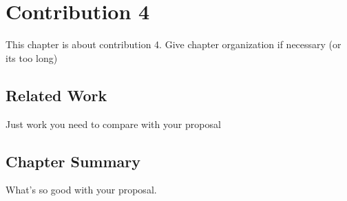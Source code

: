 \chapter{Contribution 4}\label{c6}%
This chapter is about contribution 4. Give chapter organization if
necessary (or its too long)

\section{Related Work}\label{c6:s1}
Just work you need to compare with your proposal

\section{Chapter Summary}\label{c6:s2}%
What's so good with your proposal.
